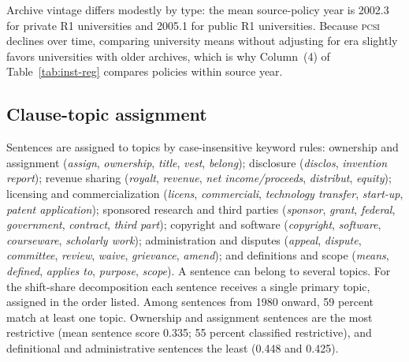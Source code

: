 Archive vintage differs modestly by type: the mean source-policy year is 2002.3 for private R1 universities and 2005.1 for public R1 universities. Because \textsc{pcsi} declines over time, comparing university means without adjusting for era slightly favors universities with older archives, which is why Column~(4) of Table~\ref{tab:inst-reg} compares policies within source year.

\subsection{Clause-topic assignment}

Sentences are assigned to topics by case-insensitive keyword rules: ownership and assignment (\emph{assign}, \emph{ownership}, \emph{title}, \emph{vest}, \emph{belong}); disclosure (\emph{disclos}, \emph{invention report}); revenue sharing (\emph{royalt}, \emph{revenue}, \emph{net income/proceeds}, \emph{distribut}, \emph{equity}); licensing and commercialization (\emph{licens}, \emph{commerciali}, \emph{technology transfer}, \emph{start-up}, \emph{patent application}); sponsored research and third parties (\emph{sponsor}, \emph{grant}, \emph{federal}, \emph{government}, \emph{contract}, \emph{third part}); copyright and software (\emph{copyright}, \emph{software}, \emph{courseware}, \emph{scholarly work}); administration and disputes (\emph{appeal}, \emph{dispute}, \emph{committee}, \emph{review}, \emph{waive}, \emph{grievance}, \emph{amend}); and definitions and scope (\emph{means}, \emph{defined}, \emph{applies to}, \emph{purpose}, \emph{scope}). A sentence can belong to several topics. For the shift-share decomposition each sentence receives a single primary topic, assigned in the order listed. Among sentences from 1980 onward, 59 percent match at least one topic. Ownership and assignment sentences are the most restrictive (mean sentence score 0.335; 55 percent classified restrictive), and definitional and administrative sentences the least (0.448 and 0.425).

